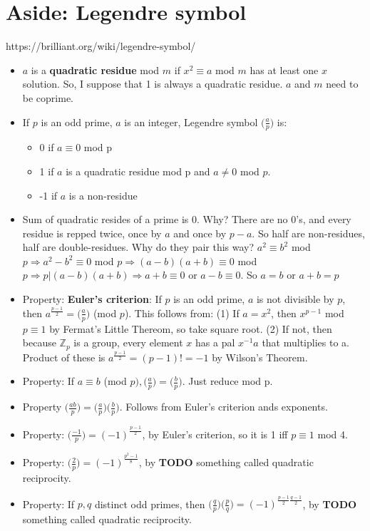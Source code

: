\documentclass[11pt, oneside]{article}   	%
\begin{document}
\section{Aside: Legendre symbol}

https://brilliant.org/wiki/legendre-symbol/

\begin{itemize}
\item $a$ is a \textbf{quadratic residue} mod $m$ if $x^2 \equiv a$ mod $m$ has at least one $x$ solution.  So, I suppose that 1 is always a quadratic residue.    $a$ and $m$ need to be coprime.
\item If $p$ is an odd prime, $a$ is an integer, Legendre symbol $\Big(\frac{a}{p}\Big)$ is:
 \begin{itemize}
 \item 0 if $a \equiv 0$ mod p
 \item 1 if $a$ is a quadratic residue mod p and $a \neq 0$ mod $p$.
 \item -1 if $a$ is a non-residue 
 \end{itemize}
 \item Sum of quadratic resides of a prime is 0.  Why?  There are no 0's, and every residue is repped twice, once by $a$ and once by $p-a$.  So half are non-residues, half are double-residues.  Why do they pair this way?  $a^2 \equiv b^2 $ mod $ p \Rightarrow a^2 - b^2 \equiv 0 $ mod $  p \Rightarrow (a-b)(a+b) \equiv 0 $ mod $ p \Rightarrow p | (a-b)(a+b) \Rightarrow a+b \equiv 0$ or $a-b \equiv 0$.  So $a = b$ or $a + b = p$
 \item Property:  \textbf{Euler's criterion}: If $p$ is an odd prime, $a$ is not divisible by $p$, then $a^\frac{p-1}{2} = \Big(\frac{a}{p}\Big)$ (mod $p$).  This follows from: (1) If $a = x^2$, then $x^{p-1}$ mod $p \equiv 1$ by Fermat's Little Thereom, so take square root.  (2) If not, then because $\mathbb{Z}_p$ is a group, every element $x$ has a pal $x^{-1}a$ that multiplies to a.  Product of these is  $a^\frac{p-1}{2} = (p-1)! = -1$ by Wilson's Theorem.
\item Property:  If $a \equiv b$ (mod $p), \Big(\frac{a}{p}\Big) =   \Big(\frac{b}{p}\Big)$.  Just reduce mod p.
\item Property  $ \Big(\frac{ab}{p}\Big) =   \Big(\frac{a}{p}\Big)   \Big(\frac{b}{p}\Big)$.  Follows from Euler's criterion ands exponents.
\item Property:   $\Big(\frac{-1}{p}\Big) = (-1)^\frac{p-1}{2}$, by Euler's criterion, so it is 1 iff $p \equiv 1$ mod 4.
\item Property:   $\Big(\frac{2}{p}\Big) = (-1)^\frac{p^2-1}{8}$, by \textbf{TODO} something called quadratic reciprocity.
\item Property:  If $p, q$ distinct odd primes, then $\Big(\frac{q}{p}\Big) \Big(\frac{p}{q}\Big)  = (-1)^{\frac{p-1}{2}\frac{q-1}{2}}$, by \textbf{TODO} something called quadratic reciprocity.


\end{itemize}
\end{document}
